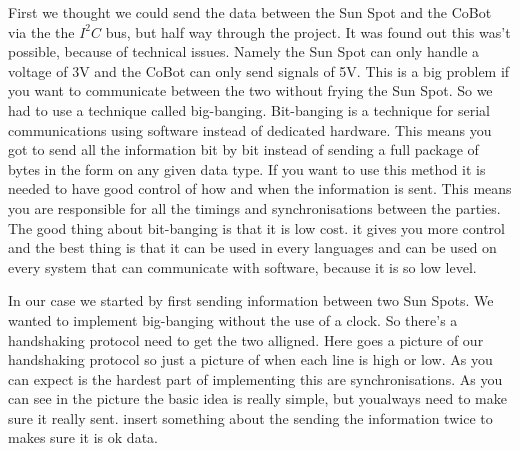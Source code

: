 \documentclass[a4,english]{article}
\begin{document}
First we thought we could send the data between the Sun Spot and the CoBot via the the $I^2C$ bus, but half way through the project. It was found out this was't possible, because of technical issues. Namely the Sun Spot can only handle a voltage of 3V and the CoBot can only send signals of 5V. This is a big problem if you want to communicate between the two without frying the Sun Spot. So we had to use a technique called big-banging. Bit-banging is a technique for serial communications using software instead of dedicated hardware. This means you got to send all the information bit by bit instead of sending a full package of bytes in the form on any given data type. If you want to use this method it is needed to have good control of how and when the information is sent. This means you are responsible for all the timings and synchronisations between the parties. The good thing about  bit-banging is that it is low cost. it gives you more control and the best thing is that it can be used in every languages and can be used on every system that can communicate with software, because it is so low level. 

In our case we started by first sending information between two Sun Spots. We wanted to implement big-banging without the use of a clock. So there's a handshaking protocol need to get the two alligned. Here goes a picture of our handshaking protocol so just a picture of when each line is high or low. 
As you can expect is the hardest part of implementing this are synchronisations. As you can see in the picture the basic idea is really simple, but youalways need to make sure it really sent. insert something about the sending the information twice to makes sure it is ok data.
\end{document}
